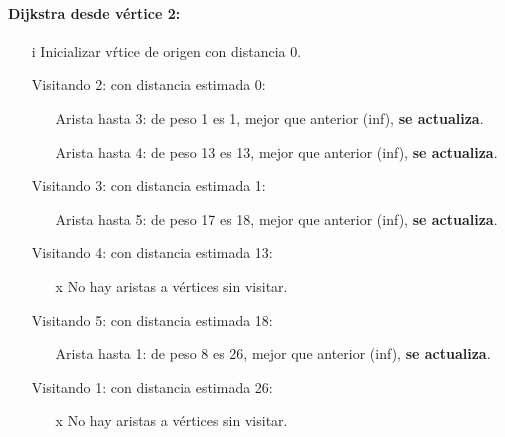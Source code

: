 \documentclass[../tp2_grupo404.tex]{subfiles}
\begin{document}
\paragraph{Dijkstra desde v\'ertice 2:}\par
\begin{enumerate}
\item[i] Inicializar v\'rtice de origen con distancia 0.
 \item[Visitando 2:] con distancia estimada 0:
\begin{enumerate}
   \item[Arista hasta 3:] de peso 1 es 1, mejor que anterior (inf), \textbf{se actualiza}.
   \item[Arista hasta 4:] de peso 13 es 13, mejor que anterior (inf), \textbf{se actualiza}.
\end{enumerate}

 \item[Visitando 3:] con distancia estimada 1:
\begin{enumerate}
   \item[Arista hasta 5:] de peso 17 es 18, mejor que anterior (inf), \textbf{se actualiza}.
\end{enumerate}

 \item[Visitando 4:] con distancia estimada 13:
\begin{enumerate}
   \item[x] No hay aristas a v\'ertices sin visitar.
\end{enumerate}

 \item[Visitando 5:] con distancia estimada 18:
\begin{enumerate}
   \item[Arista hasta 1:] de peso 8 es 26, mejor que anterior (inf), \textbf{se actualiza}.
\end{enumerate}

 \item[Visitando 1:] con distancia estimada 26:
\begin{enumerate}
   \item[x] No hay aristas a v\'ertices sin visitar.
\end{enumerate}

\end{enumerate}
\end{document}

